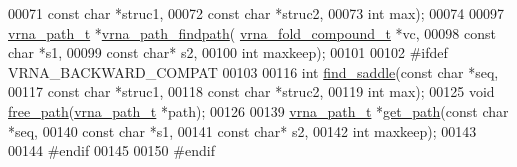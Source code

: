 \begin{DoxyCode}
00071                               \textcolor{keyword}{const} \textcolor{keywordtype}{char} *struc1,
00072                               \textcolor{keyword}{const} \textcolor{keywordtype}{char} *struc2,
00073                               \textcolor{keywordtype}{int} max);
00074 
00097 \hyperlink{group__direct__paths_structvrna__path__s}{vrna\_path\_t} *\hyperlink{group__direct__paths_ga5e1f97f58adc65016a8df88802dc16b5}{vrna\_path\_findpath}(
      \hyperlink{group__fold__compound_structvrna__fc__s}{vrna\_fold\_compound\_t} *vc,
00098                                 \textcolor{keyword}{const} \textcolor{keywordtype}{char} *s1,
00099                                 \textcolor{keyword}{const} \textcolor{keywordtype}{char}* s2,
00100                                 \textcolor{keywordtype}{int} maxkeep);
00101 
00102 \textcolor{preprocessor}{#ifdef VRNA\_BACKWARD\_COMPAT}
00103 
00116 \textcolor{keywordtype}{int} \hyperlink{group__direct__paths_gad0e14268e309af773ecd1fce6244ee50}{find\_saddle}(\textcolor{keyword}{const} \textcolor{keywordtype}{char} *seq,
00117                 \textcolor{keyword}{const} \textcolor{keywordtype}{char} *struc1,
00118                 \textcolor{keyword}{const} \textcolor{keywordtype}{char} *struc2,
00119                 \textcolor{keywordtype}{int} max);
00125 \textcolor{keywordtype}{void}    \hyperlink{group__direct__paths_ga9056421d716ae89f0ed3f107627f395b}{free\_path}(\hyperlink{group__direct__paths_structvrna__path__s}{vrna\_path\_t} *path);
00126 
00139 \hyperlink{group__direct__paths_structvrna__path__s}{vrna\_path\_t} *\hyperlink{group__direct__paths_ga0b22426253e190bd268f86b01b71220d}{get\_path}(\textcolor{keyword}{const} \textcolor{keywordtype}{char} *seq,
00140                       \textcolor{keyword}{const} \textcolor{keywordtype}{char} *s1,
00141                       \textcolor{keyword}{const} \textcolor{keywordtype}{char}* s2,
00142                       \textcolor{keywordtype}{int} maxkeep);
00143 
00144 \textcolor{preprocessor}{#endif}
00145 
00150 \textcolor{preprocessor}{#endif}
\end{DoxyCode}
